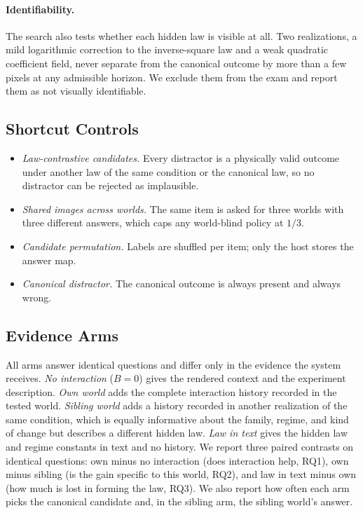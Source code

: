 \paragraph{Identifiability.} The search also tests whether each hidden law is visible at all. Two
realizations, a mild logarithmic correction to the inverse-square law and a weak quadratic coefficient
field, never separate from the canonical outcome by more than a few pixels at any admissible horizon.
We exclude them from the exam and report them as not visually identifiable.

\subsection{Shortcut Controls}
\begin{itemize}
  \item \emph{Law-contrastive candidates.} Every distractor is a physically valid outcome under another
  law of the same condition or the canonical law, so no distractor can be rejected as implausible.
  \item \emph{Shared images across worlds.} The same item is asked for three worlds with three different
  answers, which caps any world-blind policy at $1/3$.
  \item \emph{Candidate permutation.} Labels are shuffled per item; only the host stores the answer map.
  \item \emph{Canonical distractor.} The canonical outcome is always present and always wrong.
\end{itemize}

\subsection{Evidence Arms}
\label{sec:protocol:ablations}
All arms answer identical questions and differ only in the evidence the system receives.
\emph{No interaction} ($B=0$) gives the rendered context and the experiment description.
\emph{Own world} adds the complete interaction history recorded in the tested world.
\emph{Sibling world} adds a history recorded in another realization of the same condition, which is
equally informative about the family, regime, and kind of change but describes a different hidden law.
\emph{Law in text} gives the hidden law and regime constants in text and no history.
We report three paired contrasts on identical questions: own minus no interaction (does interaction
help, RQ1), own minus sibling (is the gain specific to this world, RQ2), and law in text minus own
(how much is lost in forming the law, RQ3). We also report how often each arm picks the canonical
candidate and, in the sibling arm, the sibling world's answer.

